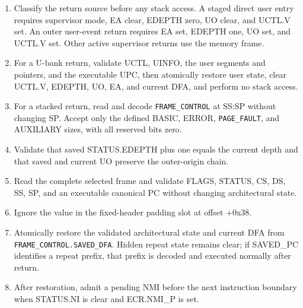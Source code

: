 {\raggedright
\begin{enumerate}
\item Classify the return source before any stack access. A staged direct user entry requires supervisor mode, EA clear, EDEPTH zero, UO clear, and UCTL.V set. An outer user-event return requires EA set, EDEPTH one, UO set, and UCTL.V set. Other active supervisor returns use the memory frame.
\item For a U-bank return, validate UCTL, UINFO, the user segments and pointers, and the executable UPC, then atomically restore user state, clear UCTL.V, EDEPTH, UO, EA, and current DFA, and perform no stack access.
\item For a stacked return, read and decode \texttt{FRAME\_CONTROL} at SS:SP without changing SP. Accept only the
defined BASIC, ERROR, \texttt{PAGE\_FAULT}, and AUXILIARY sizes, with all reserved bits zero.
\item Validate that saved STATUS.EDEPTH plus one equals the current depth and that saved and current UO preserve the outer-origin chain.
\item Read the complete selected frame and validate FLAGS, STATUS, CS, DS, SS, SP, and an executable canonical PC without changing architectural state.
\item Ignore the value in the fixed-header padding slot at offset +0x38.
\item Atomically restore the validated architectural state and current DFA from
\texttt{FRAME\_CONTROL.SAVED\_DFA}. Hidden repeat state remains clear;
if SAVED\_PC identifies a repeat prefix, that prefix is decoded and executed normally after return.
\item After restoration, admit a pending NMI before the next instruction boundary when STATUS.NI is clear and ECR.NMI\_P is set.
\end{enumerate}
\par}
